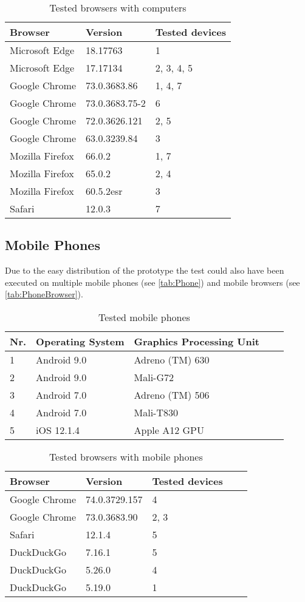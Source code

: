 \begin{table}[h]
	\centering
	\begin{tabular}{lll}
		Browser & Version & Tested devices \\ \hline
		\rule{0pt}{15pt}Microsoft Edge & 18.17763 & 1 \\
		Microsoft Edge & 17.17134 & 2, 3, 4, 5 \\
		Google Chrome & 73.0.3683.86 & 1, 4, 7 \\
		Google Chrome & 73.0.3683.75-2 & 6 \\
		Google Chrome & 72.0.3626.121 & 2, 5 \\
		Google Chrome & 63.0.3239.84 & 3 \\
		Mozilla Firefox & 66.0.2 & 1, 7 \\
		Mozilla Firefox & 65.0.2 & 2, 4 \\
		Mozilla Firefox & 60.5.2esr & 3 \\
		Safari & 12.0.3 & 7
	\end{tabular}
	\caption{Tested browsers with computers}
	\label{tab:PCBrowser}
\end{table}


\subsection{Mobile Phones}
Due to the easy distribution of the prototype the test could also have been executed on multiple mobile phones (see \autoref{tab:Phone}) and mobile browsers (see \autoref{tab:PhoneBrowser}).

\begin{table}[h]
	\centering
	\begin{tabular}{lllll}
		Nr. & Operating System & Graphics Processing Unit \\ \hline
		\rule{0pt}{15pt}1 & Android 9.0 & Adreno (TM) 630 \\
		2 & Android 9.0 & Mali-G72  \\
		3 & Android 7.0 & Adreno (TM) 506 \\
		4 & Android 7.0 & Mali-T830 \\
		5 & iOS 12.1.4 & Apple A12 GPU 
	\end{tabular}
\caption{Tested mobile phones}
\label{tab:Phone}
\end{table}


\begin{table}[h]
	\centering
	\begin{tabular}{lllll}
		Browser & Version & Tested devices \\ \hline
		\rule{0pt}{15pt}Google Chrome & 74.0.3729.157 & 4 \\
		Google Chrome & 73.0.3683.90 & 2, 3  \\
		Safari & 12.1.4 & 5 \\
		DuckDuckGo & 7.16.1 & 5 \\
		DuckDuckGo & 5.26.0 & 4 \\
		DuckDuckGo & 5.19.0 & 1 
	\end{tabular}
	\caption{Tested browsers with mobile phones}
	\label{tab:PhoneBrowser}
\end{table}

